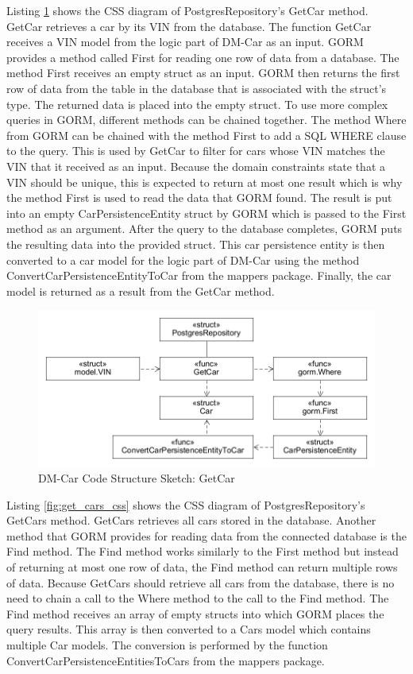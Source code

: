 Listing \ref{fig:get_car_css} shows the CSS diagram of PostgresRepository's GetCar method.
GetCar retrieves a car by its VIN from the database.
The function GetCar receives a VIN model from the logic part of DM-Car as an input.
GORM provides a method called First for reading one row of data from a database.
The method First receives an empty struct as an input. GORM then returns the first row
of data from the table in the database that is associated with the struct's type.
The returned data is placed into the empty struct. To use more complex queries in GORM,
different methods can be chained together. The method Where from GORM can be chained
with the method First to add a SQL WHERE clause to the query.
This is used by GetCar to filter for cars whose VIN matches the VIN that it received as an input.
Because the domain constraints state that a VIN should be unique, this is expected to return at most
one result which is why the method First is used to read the data that GORM found.
The result is put into an empty CarPersistenceEntity struct by GORM which is passed to the First method as an argument.
After the query to the database completes, GORM puts the resulting data into the provided struct.
This car persistence entity is then converted to a car model for the logic part of DM-Car
using the method ConvertCarPersistenceEntityToCar from the mappers package.
Finally, the car model is returned as a result from the GetCar method.

\begin{figure}[tb]
	\centering
	\includegraphics[width=\textwidth]{figures/8.12_GetCarCSS.png}
	\caption{DM-Car Code Structure Sketch: GetCar}
	\label{fig:get_car_css}
\end{figure}

Listing \ref{fig:get_cars_css} shows the CSS diagram of PostgresRepository's GetCars method.
GetCars retrieves all cars stored in the database.
Another method that GORM provides for reading data from the connected database is the Find method.
The Find method works similarly to the First method but instead of returning at most one row of data,
the Find method can return multiple rows of data. Because GetCars should retrieve all cars
from the database, there is no need to chain a call to the Where method to the call to the Find method.
The Find method receives an array of empty structs into which GORM places the query results.
This array is then converted to a Cars model which contains multiple Car models.
The conversion is performed by the function ConvertCarPersistenceEntitiesToCars from the mappers package.

